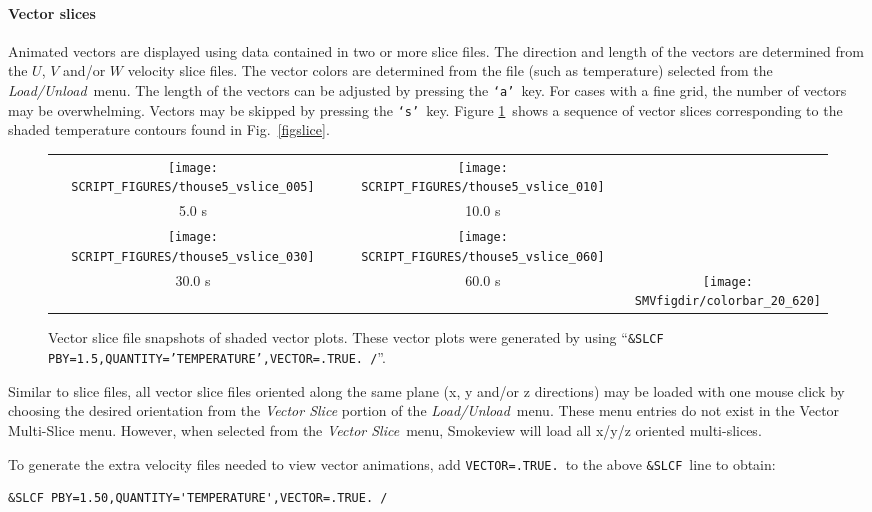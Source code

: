 \documentclass[11pt,twoside]{book}
\newcommand{\figheightAbar}{2.2in}
\begin{document}
\paragraph{Vector slices}Animated vectors are displayed using data contained in two or more
slice files.  The direction and length of the vectors are
determined from the $U$, $V$ and/or $W$ velocity slice files. The
vector colors are determined from the file (such as temperature)
selected from the {\em Load/Unload}\ menu. The length of the
vectors can be adjusted by pressing the {\tt `a'}\ key. For cases
with a fine grid, the number of vectors may be overwhelming.
Vectors may be skipped by pressing the {\tt `s'}\ key.  Figure
\ref{figvslice}\ shows a sequence of vector slices corresponding to
the shaded temperature contours found in Fig.~\ref{figslice}.

\begin{figure}[bph]
\begin{center}
\begin{tabular}{ccc}
\texttt{[image: SCRIPT\_FIGURES/thouse5\_vslice\_005]}&
\texttt{[image: SCRIPT\_FIGURES/thouse5\_vslice\_010]}\\
5.0 s&10.0 s\\
\texttt{[image: SCRIPT\_FIGURES/thouse5\_vslice\_030]}&
\texttt{[image: SCRIPT\_FIGURES/thouse5\_vslice\_060]}\\
30.0 s&60.0 s
&\raisebox{0.0ex}[0pt]{\texttt{[image: \\SMVfigdir/colorbar\_20\_620]}}\\
\end{tabular}
\end{center}
\caption [Vector slice file snapshots of shaded vector plots.]
{Vector slice file snapshots of shaded vector plots. These vector
plots were generated by using ``{\tt \&SLCF
PBY=1.5,QUANTITY='TEMPERATURE',VECTOR=.TRUE. /}''.}
\label{figvslice}%
\end{figure}

Similar to slice files, all vector slice files oriented along the same plane (x, y and/or z directions) may be loaded
with one mouse click by choosing the desired orientation from the {\em Vector Slice}
portion of the {\em Load/Unload}\ menu.  These menu entries do not exist in the Vector Multi-Slice menu.
However, when selected from the {\em Vector Slice}\ menu, Smokeview will load all x/y/z oriented multi-slices.

To generate the extra velocity files needed to view vector
animations, add {\tt VECTOR=.TRUE.}\ to the above {\tt \&SLCF}\ line
to obtain:
\begin{lstlisting}
&SLCF PBY=1.50,QUANTITY='TEMPERATURE',VECTOR=.TRUE. /
\end{lstlisting}
\end{document}
